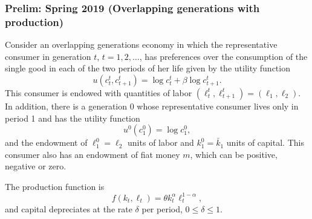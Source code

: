 \documentclass[11pt,english]{article}
\begin{document}
\subsubsection{Prelim: Spring 2019 (Overlapping generations with production)}
Consider an overlapping generations economy in which the representative
consumer in generation $t$, $t = 1, 2, \ldots$, has preferences over the
consumption of the single good in each of the two periods of her life given by
the utility function
\[
    u(c_t^t, c_{t+1}^t) = \log c_t^t + \beta \log c_{t+1}^t.
\]
This consumer is endowed with quantities of labor $(\ell_t^t, \ell_{t+1}^t) =
(\ell_1, \ell_2)$. In addition, there is a generation 0 whose representative
consumer lives only in period 1 and has the utility function
\[
    u^0(c_1^0) = \log c_1^0,
\]
and the endowment of $\ell_1^0 = \ell_2$ units of labor and $k_1^0 =
\bar{k}_1$ units of capital. This consumer also has an endowment of fiat money
$m$, which can be positive, negative or zero.
 
The production function is
\[
    f(k_t, \ell_t) = \theta k_t^\alpha \ell_t^{1-\alpha},
\]
and capital depreciates at the rate $\delta$ per period, $0 \leq \delta \leq
1$.
 
\end{document}
